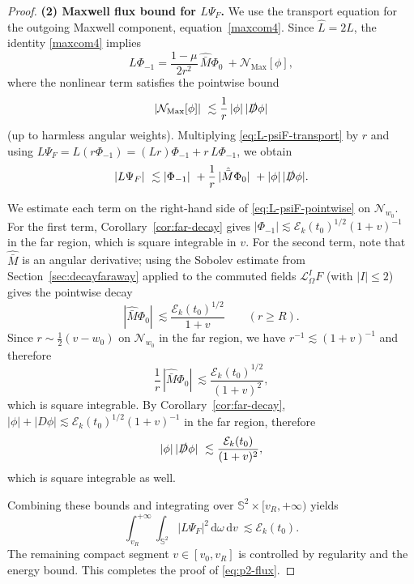 \documentclass[11pt]{article}
\numberwithin{equation}{section}
\theoremstyle{plain}
\theoremstyle{definition}
\theoremstyle{remark}
\newcommand{\dd}{\mathrm{d}}
\begin{document}
\begin{proof}
\smallskip\noindent
\textbf{(2) Maxwell flux bound for $L\Psi_F$.}
We use the transport equation for the outgoing Maxwell component, equation~\eqref{maxcom4}.
Since $\hat L = 2L$, the identity \eqref{maxcom4} implies
\begin{equation}\label{eq:L-psiF-transport}
L\Phi_{-1}
=
\frac{1-\mu}{2r^2}\,\hat{\bar M}\Phi_0
\ +
\mathcal{N}_{\mathrm{Max}}[\phi],
\end{equation}
where the nonlinear term satisfies the pointwise bound
\begin{equation}\label{eq:Nmax-bound}
|\mathcal{N}_{\mathrm{Max}}[\phi]|
\ \lesssim
\frac{1}{r}\,|\phi|\,|\slashed D\phi|
\end{equation}
(up to harmless angular weights).
Multiplying \eqref{eq:L-psiF-transport} by $r$ and using $L\Psi_F = L(r\Phi_{-1}) = (Lr)\Phi_{-1} + r\,L\Phi_{-1}$, we obtain
\begin{equation}\label{eq:L-psiF-pointwise}
|L\Psi_F|
\ \lesssim
|\Phi_{-1}|
\ +
\frac{1}{r}\,|\hat{\bar M}\Phi_0|
\ +
|\phi|\,|\slashed D\phi|.
\end{equation}

We estimate each term on the right-hand side of \eqref{eq:L-psiF-pointwise} on $\mathcal{N}_{w_0}$.
For the first term, Corollary~\ref{cor:far-decay} gives $|\Phi_{-1}|\lesssim \mathcal{E}_k(t_0)^{1/2}(1+v)^{-1}$ in the far region, which is square integrable in $v$.
For the second term, note that $\hat{\bar M}$ is an angular derivative; using the Sobolev estimate from Section~\ref{sec:decayfaraway} applied to the commuted fields $\mathcal{L}_{\Omega}^I F$ (with $|I|\le 2$) gives the pointwise decay
\begin{equation}
|\hat{\bar M}\Phi_0|
\ \lesssim
\frac{\mathcal{E}_k(t_0)^{1/2}}{1+v}
\qquad (r\ge R).
\end{equation}
Since $r\sim \tfrac12(v-w_0)$ on $\mathcal{N}_{w_0}$ in the far region, we have $r^{-1}\lesssim (1+v)^{-1}$ and therefore
\begin{equation}
\frac{1}{r}\,|\hat{\bar M}\Phi_0|
\ \lesssim
\frac{\mathcal{E}_k(t_0)^{1/2}}{(1+v)^2},
\end{equation}
which is square integrable.
By Corollary~\ref{cor:far-decay}, $|\phi|+|D\phi|\lesssim \mathcal{E}_k(t_0)^{1/2}(1+v)^{-1}$ in the far region, therefore
\begin{equation}
|\phi|\,|\slashed D\phi|
\ \lesssim
\frac{\mathcal{E}_k(t_0)}{(1+v)^2},
\end{equation}
which is square integrable as well.

Combining these bounds and integrating over $\mathbb{S}^2\times [v_R,+\infty)$ yields
\begin{equation}
\int_{v_R}^{+\infty}\!\!\int_{\mathbb{S}^2} |L\Psi_F|^2\,\dd\omega\,\dd v
\ \lesssim
\mathcal{E}_k(t_0).
\end{equation}
The remaining compact segment $v\in[v_0,v_R]$ is controlled by regularity and the energy bound.
This completes the proof of \eqref{eq:p2-flux}.
\end{proof}
\end{document}
